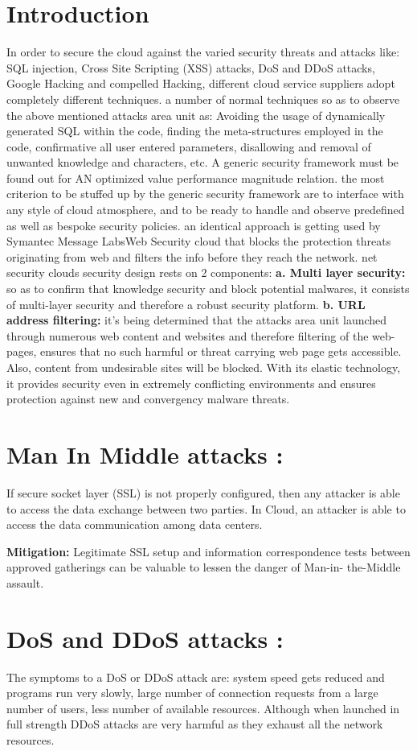 \section{Introduction}
In order to secure the cloud against the varied security threats and attacks like: SQL injection, Cross Site Scripting (XSS) attacks, DoS and DDoS attacks, Google Hacking and compelled Hacking, different cloud service suppliers adopt completely different techniques. a number of normal techniques so as to observe the above mentioned attacks area unit as: Avoiding the usage of dynamically generated
SQL within the code, finding the meta-structures employed in the code, confirmative all user entered parameters, disallowing and removal of unwanted knowledge and characters, etc. A generic security framework must be found out for AN optimized value performance magnitude relation. the most criterion to be stuffed up by the generic security framework are to interface with any style of cloud atmosphere, and to be ready to handle and observe predefined as well as bespoke security policies. an identical approach is getting used by Symantec Message LabsWeb Security cloud that blocks the protection threats originating from web and filters the info
before they reach the network. net security clouds security design rests on 2 components:
\textbf{a. Multi layer security:} so as to confirm that knowledge security and block potential malwares, it consists of multi-layer security and therefore a robust security platform.
\textbf{b. URL address filtering:} it's being determined that the attacks area unit launched through numerous web content and websites and therefore filtering of the web-pages, ensures that no such harmful or threat carrying web page gets accessible. Also, content from undesirable sites will be blocked. With its
elastic technology, it provides security even in extremely conflicting environments and ensures protection against new and convergency malware threats.
\section{Man In Middle attacks :}
If secure socket layer (SSL) is not properly configured, then any attacker is able to access the data exchange between two parties. In Cloud, an attacker is able to access the data communication among data centers.

\textbf{Mitigation:} Legitimate SSL setup and information correspondence tests between approved gatherings can be valuable to lessen the danger of Man-in- the-Middle assault.
\section{DoS and DDoS attacks : }
The symptoms to a DoS or DDoS attack are: system speed gets reduced and programs run very slowly, large number of connection requests from a large number of users, less number of available resources. Although when launched in full strength DDoS attacks are very harmful as they exhaust all the network resources. 

